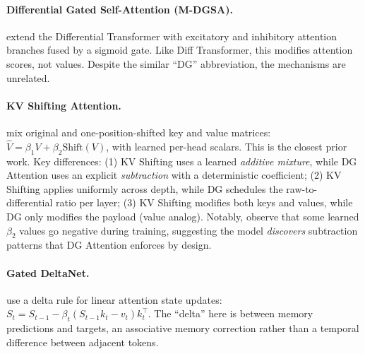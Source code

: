 \documentclass[11pt]{article}
\begin{document}
\paragraph{Differential Gated Self-Attention (M-DGSA).}
\citet{lygizou2025mdgsa} extend the Differential Transformer with excitatory and inhibitory attention branches fused by a sigmoid gate. Like Diff Transformer, this modifies attention scores, not values. Despite the similar ``DG'' abbreviation, the mechanisms are unrelated.

\paragraph{KV Shifting Attention.}
\citet{xu2024kvshift} mix original and one-position-shifted key and value matrices: $\hat{V} = \beta_1 V + \beta_2 \text{Shift}(V)$, with learned per-head scalars. This is the closest prior work. Key differences: (1) KV Shifting uses a learned \emph{additive mixture}, while DG Attention uses an explicit \emph{subtraction} with a deterministic coefficient; (2) KV Shifting applies uniformly across depth, while DG schedules the raw-to-differential ratio per layer; (3) KV Shifting modifies both keys and values, while DG only modifies the payload (value analog). Notably, \citeauthor{xu2024kvshift} observe that some learned $\beta_2$ values go negative during training, suggesting the model \emph{discovers} subtraction patterns that DG Attention enforces by design.

\paragraph{Gated DeltaNet.}
\citet{yang2024deltanet,kautz2025gated} use a delta rule for linear attention state updates: $S_t = S_{t-1} - \beta_t(S_{t-1}k_t - v_t)k_t^\top$. The ``delta'' here is between memory predictions and targets, an associative memory correction rather than a temporal difference between adjacent tokens.
\end{document}
